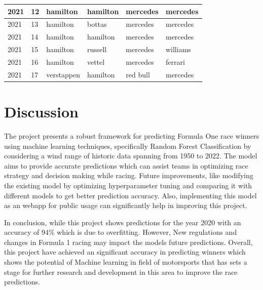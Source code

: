 \documentclass[11pt,article,oneside]{article}
\begin{document}
\begin{table}[htbp]
\begin{tabular}{|l|l|l|l|l|l|}
    2021             & 12             & hamilton            & hamilton                    & mercedes                 & mercedes                                  \\ \hline
    2021             & 13             & hamilton            & bottas                      & mercedes                 & mercedes                                  \\ \hline
    2021             & 14             & hamilton            & hamilton                    & mercedes                 & mercedes                                  \\ \hline
    2021             & 15             & hamilton            & russell                    & mercedes                 & williams                                  \\ \hline
    2021             & 16             & hamilton            & vettel                    & mercedes                 & ferrari                                \\ \hline
    2021             & 17             & verstappen          & hamilton                    & red bull                 & mercedes                                 \\ \hline
    
    \end{tabular}
\end{table}

\section{Discussion}

The project presents a robust framework for predicting Formula One race winners using machine learning techniques, specifically Random Forest Classification by considering a wind range of historic data spanning from 1950 to 2022. The model aims to provide accurate predictions which can assist teams in optimizing race strategy and decision making while racing.
Future improvements, like modifying the existing model by optimizing hyperparameter tuning and comparing it with different models to get better prediction accuracy. Also, implementing this model as an webapp for public usage can significantly help in improving this project. 


In conclusion, while this project shows predictions for the year 2020 with an accuracy of 94\% which is due to overfitting. However, New regulations and changes in Formula 1 racing may impact the models future predictions. 
Overall, this project have achieved an significant accuracy in predicting winners which shows the potential of Machine learning in field of motorsports that has sets a stage for further research and development in this area to improve the race predictions.

\printbibliography
\end{document}

